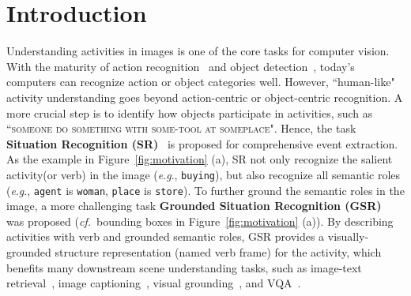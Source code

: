 \documentclass[letterpaper]{article} \usepackage{aaai22}  \usepackage{times}  \usepackage{helvet}  \usepackage{courier}  \usepackage[hyphens]{url}  \usepackage{graphicx} \urlstyle{rm} \def\UrlFont{\rm}  \usepackage{natbib}  \usepackage{caption} \DeclareCaptionStyle{ruled}{labelfont=normalfont,labelsep=colon,strut=off} \frenchspacing  \setlength{\pdfpagewidth}{8.5in}  \setlength{\pdfpageheight}{11in}
\newcommand{\eg}{\textit{e}.\textit{g}.}
\newcommand{\cf}{\textit{cf.}}
\begin{document}
\section{Introduction}







Understanding activities in images is one of the core tasks for computer vision. 
With the maturity of action recognition~\cite{carreira2017quo, wang2016temporal} and object detection~\cite{ren2015faster}, today's computers can recognize action or object categories well. 
However, ``human-like" activity understanding goes beyond action-centric or object-centric recognition. 
A more crucial step is to identify how objects participate in activities, such as ``\textsc{someone do something with some-tool at someplace}". 
Hence, the task \textbf{Situation Recognition (SR)}~\cite{yatskar2016situation} is proposed for comprehensive event extraction.  
As the example in Figure~\ref{fig:motivation} (a), SR not only recognize the salient activity(or verb) in the image (\eg, \texttt{buying}), but also recognize all semantic roles (\eg, \texttt{agent} is \texttt{woman}, \texttt{place} is \texttt{store}). To further ground the semantic roles in the image, a more challenging task \textbf{Grounded Situation Recognition (GSR)}~\cite{pratt2020grounded} was proposed (\cf~bounding boxes in Figure~\ref{fig:motivation} (a)). By describing activities with verb and grounded semantic roles, GSR provides a visually-grounded structure representation (named verb frame) for the activity, which benefits many downstream scene understanding tasks, such as image-text retrieval~\cite{gordo2016deep, noh2017large}, image captioning~\cite{mallya2017recurrent,chen2021human,chen2017sca}, visual grounding~\cite{chen2021ref}, and VQA~\cite{cadene2019murel,Chen_2020_CVPR,chen2021counterfactual,xiao2022video}.
\end{document}
